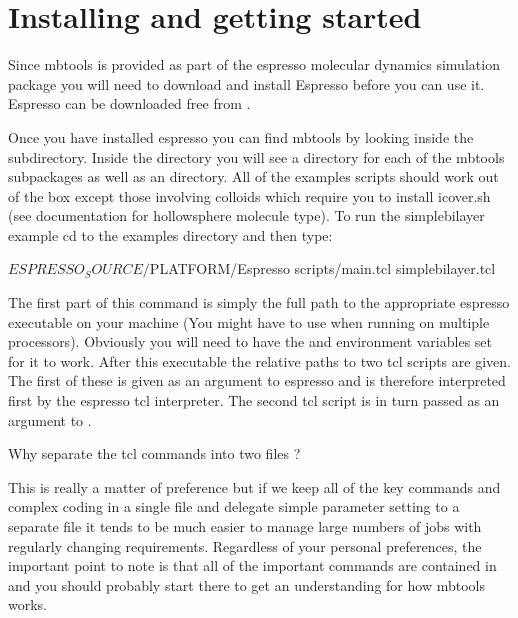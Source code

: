 \section{Installing and getting started}

 Since mbtools is provided as part of the espresso molecular dynamics simulation package you will need to download and install Espresso before you can use it. Espresso can be downloaded free from  .

Once you have installed espresso you can find mbtools by looking inside the  subdirectory. Inside the  directory you will see a directory for each of the mbtools subpackages as well as an  directory. All of the examples scripts should work out of the box except those involving colloids which require you to install icover.sh (see documentation for hollowsphere molecule type). To run the simplebilayer example cd to the examples directory and then type: 

\begin{code}
  $ESPRESSO_SOURCE/$PLATFORM/Espresso scripts/main.tcl simplebilayer.tcl
\end{code}

The first part of this command is simply the full path to the appropriate espresso executable on your machine (You might have to use  when running on multiple processors). Obviously you will need to have the  and  environment variables set for it to work. After this executable the relative paths to two tcl scripts are given. The first of these  is given as an argument to espresso and is therefore interpreted first by the espresso tcl interpreter. The second tcl script  is in turn passed as an argument to .

Why separate the tcl commands into two files ?

This is really a matter of preference but if we keep all of the key commands and complex coding in a single file  and delegate simple parameter setting to a separate file it tends to be much easier to manage large numbers of jobs with regularly changing requirements. Regardless of your personal preferences, the important point to note is that all of the important commands are contained in  and you should probably start there to get an understanding for how mbtools works.

